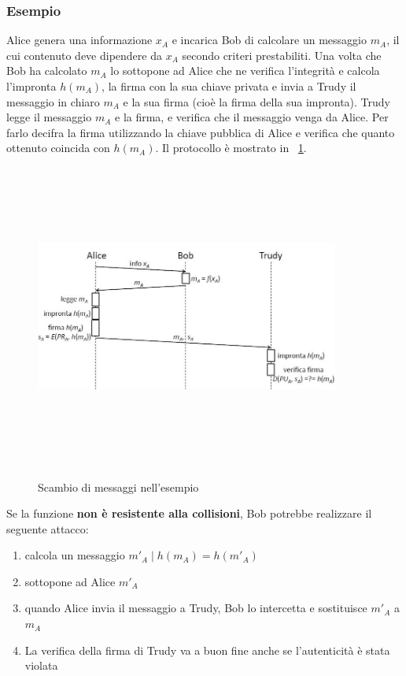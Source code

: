 \subsubsection{Esempio}
Alice genera una informazione $x_{A}$ e incarica Bob di calcolare un messaggio $m_{A}$, il cui contenuto deve dipendere da $x_{A}$ secondo criteri prestabiliti. Una volta che Bob ha calcolato $m_{A}$ lo sottopone ad Alice che ne verifica l'integrità e calcola l'impronta $h(m_{A})$, la firma con la sua chiave privata e invia a Trudy il messaggio in chiaro $m_{A}$ e la sua firma (cioè la firma della sua impronta). Trudy legge il messaggio $m_{A}$ e la firma, e verifica che il messaggio venga da Alice. Per farlo decifra la firma utilizzando la chiave pubblica di Alice e verifica che quanto ottenuto coincida con $h(m_{A})$. Il protocollo è mostrato in \figurename~\ref{fig:esempio_res_coll}.
\begin{figure}
	\begin{center}
	{\includegraphics[height=10cm, width=10cm, keepaspectratio]{Immagini/hash/schema_hash_collisioni.JPG}}
	\caption{Scambio di messaggi nell'esempio\label{fig:esempio_res_coll}}
	\end{center}
\end{figure}
Se la funzione \textbf{non è resistente alla collisioni}, Bob potrebbe realizzare il seguente attacco:
\begin{enumerate}
\item calcola un messaggio $m'_{A} \mid h(m_{A}) = h(m'_{A})$
\item sottopone ad Alice $m'_{A}$
\item quando Alice invia il messaggio a Trudy, Bob lo intercetta e sostituisce $m'_{A}$ a $m_{A}$
\item La verifica della firma di Trudy va a buon fine anche se l'autenticità è stata violata
\end{enumerate}

